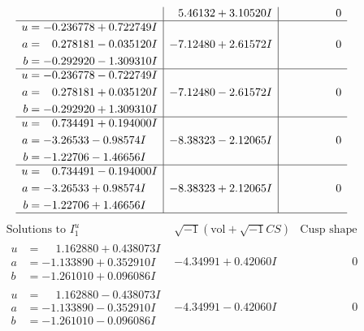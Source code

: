 \documentclass[1p]{elsarticle_modified}
\theoremstyle{definition}
\newcommand{\I}{\sqrt{-1}}
\begin{document}
$$\begin{array}{c|c|c}
 & \phantom{-}5.46132 + 3.10520 I & \phantom{-0.000000 } 0 \\ \hline\begin{aligned}
u &= -0.236778 + 0.722749 I \\
a &= \phantom{-}0.278181 - 0.035120 I \\
b &= -0.292920 - 1.309310 I\end{aligned}
 & -7.12480 + 2.61572 I & \phantom{-0.000000 } 0 \\ \hline\begin{aligned}
u &= -0.236778 - 0.722749 I \\
a &= \phantom{-}0.278181 + 0.035120 I \\
b &= -0.292920 + 1.309310 I\end{aligned}
 & -7.12480 - 2.61572 I & \phantom{-0.000000 } 0 \\ \hline\begin{aligned}
u &= \phantom{-}0.734491 + 0.194000 I \\
a &= -3.26533 - 0.98574 I \\
b &= -1.22706 - 1.46656 I\end{aligned}
 & -8.38323 - 2.12065 I & \phantom{-0.000000 } 0 \\ \hline\begin{aligned}
u &= \phantom{-}0.734491 - 0.194000 I \\
a &= -3.26533 + 0.98574 I \\
b &= -1.22706 + 1.46656 I\end{aligned}
 & -8.38323 + 2.12065 I & \phantom{-0.000000 } 0\\
 \hline 
 \end{array}$$\newpage$$\begin{array}{c|c|c}  
\text{Solutions to }I^u_{1}& \I (\text{vol} + \sqrt{-1}CS) & \text{Cusp shape}\\
 \hline 
\begin{aligned}
u &= \phantom{-}1.162880 + 0.438073 I \\
a &= -1.133890 + 0.352910 I \\
b &= -1.261010 + 0.096086 I\end{aligned}
 & -4.34991 + 0.42060 I & \phantom{-0.000000 } 0 \\ \hline\begin{aligned}
u &= \phantom{-}1.162880 - 0.438073 I \\
a &= -1.133890 - 0.352910 I \\
b &= -1.261010 - 0.096086 I\end{aligned}
 & -4.34991 - 0.42060 I & \phantom{-0.000000 } 0 \\ \hline\begin{aligned}

\end{aligned}
\end{array}$$
\end{document}
